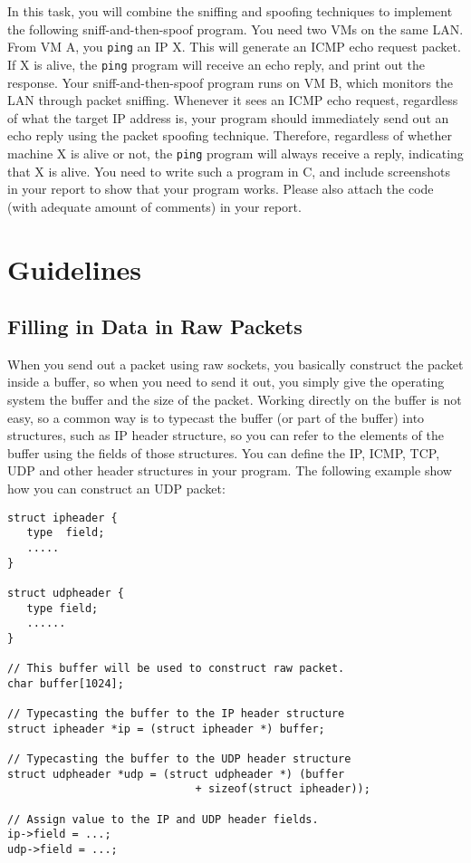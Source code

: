 In this task, you will combine the sniffing and spoofing techniques
to implement the following sniff-and-then-spoof program. 
You need two VMs on the same LAN. From VM A, you 
{\tt ping} an IP X. This will generate an ICMP echo 
request packet. If X is alive, the {\tt ping} program will receive 
an echo reply, and print out the response. Your sniff-and-then-spoof
program runs on VM B, which monitors the LAN through packet sniffing. Whenever it 
sees an ICMP echo request, regardless of what the target IP address is,
your program should immediately send out an echo reply using the 
packet spoofing technique. Therefore, regardless of whether machine X
is alive or not, the {\tt ping} program will always receive 
a reply, indicating that X is alive. You need to write such a program in C, and
include screenshots in your report to show that 
your program works. Please also attach the code (with adequate amount 
of comments) in your report.







\section{Guidelines} 



\subsection{Filling in Data in Raw Packets}


When you send out a packet using raw sockets, you basically construct 
the packet inside a buffer, so when you need to send it out, you simply
give the operating system the buffer and the size of the packet. 
Working directly on the buffer is not easy, so a common way is to
typecast the buffer (or part of the buffer) into 
structures, such as IP header structure, so you can refer to the elements
of the buffer using the fields of those structures. 
You can define the IP, ICMP, TCP, UDP and other header structures in your 
program. The following example show how you can construct an UDP packet:

 
\begin{lstlisting}
struct ipheader {
   type  field;
   .....
}

struct udpheader {
   type field;
   ......
}

// This buffer will be used to construct raw packet.
char buffer[1024];

// Typecasting the buffer to the IP header structure
struct ipheader *ip = (struct ipheader *) buffer;

// Typecasting the buffer to the UDP header structure
struct udpheader *udp = (struct udpheader *) (buffer
                             + sizeof(struct ipheader));

// Assign value to the IP and UDP header fields.
ip->field = ...;
udp->field = ...;
\end{lstlisting}



